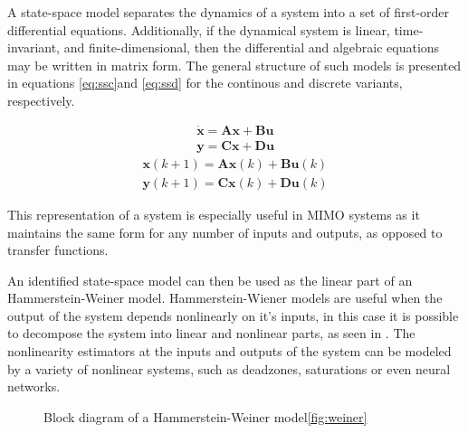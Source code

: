 A state-space model separates the dynamics of a system into a set of first-order differential equations.
Additionally, if the dynamical system is linear, time-invariant, and finite-dimensional, then the differential and algebraic equations may be written in matrix form. The general structure of such models is presented in equations \ref{eq:ssc}and \ref{eq:ssd} for the continous and discrete variants, respectively.

\begin{align}\label{eq:ssc}
\dot{\mathbf{x}} = \mathbf{A}\mathbf{x} + \mathbf{B}\mathbf{u} \\
\mathbf{y} = \mathbf{C}\mathbf{x} + \mathbf{D}\mathbf{u}
\end{align}
\vspace{-0.5cm}
\begin{align}\label{eq:ssd}
\mathbf{x}(k+1) = \mathbf{A}\mathbf{x}(k) + \mathbf{B}\mathbf{u}(k)\\
\mathbf{y}(k+1) = \mathbf{C}\mathbf{x}(k) + \mathbf{D}\mathbf{u}(k)
\end{align}

This representation of a system is especially useful in MIMO systems as it maintains the same form for any number of inputs and outputs, as opposed to transfer functions.

An identified state-space model can then be used as the linear part of an Hammerstein-Weiner model.
Hammerstein-Wiener models are useful when the output of the system depends nonlinearly on it's inputs, in this case it is possible to decompose the system into linear and nonlinear parts, as seen in . 
The nonlinearity estimators at the inputs and outputs of the system can be modeled by a variety of nonlinear systems, such as deadzones, saturations or even neural networks.

\begin{figure} 
\centering
{}
\caption{Block diagram of a Hammerstein-Weiner model\ref{fig:weiner}}
\label{weiner}
\end{figure}

